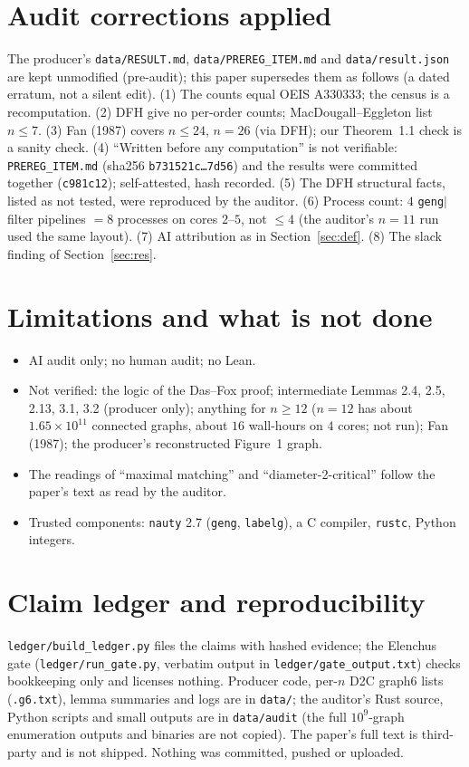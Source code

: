 \documentclass[10pt]{article}
\begin{document}
\section{Audit corrections applied}\label{sec:corr}
The producer's \texttt{data/RESULT.md}, \texttt{data/PREREG\_ITEM.md} and \texttt{data/result.json} are kept unmodified (pre-audit); this paper supersedes them as follows (a dated erratum, not a silent edit). (1) The counts equal OEIS A330333; the census is a recomputation. (2) DFH give no per-order counts; MacDougall--Eggleton list $n\le7$. (3) Fan (1987) covers $n\le24$, $n=26$ (via DFH); our Theorem~1.1 check is a sanity check. (4) ``Written before any computation'' is not verifiable: \texttt{PREREG\_ITEM.md} (sha256 \texttt{b731521c\dots 7d56}) and the results were committed together (\texttt{c981c12}); self-attested, hash recorded. (5) The DFH structural facts, listed as not tested, were reproduced by the auditor. (6) Process count: $4$ \texttt{geng}$|$filter pipelines $=8$ processes on cores $2$--$5$, not $\le4$ (the auditor's $n=11$ run used the same layout). (7) AI attribution as in Section~\ref{sec:def}. (8) The slack finding of Section~\ref{sec:res}.

\section{Limitations and what is not done}\label{sec:lim}
\begin{itemize}\itemsep=1pt
\item AI audit only; no human audit; no Lean.
\item Not verified: the logic of the Das--Fox proof; intermediate Lemmas 2.4, 2.5, 2.13, 3.1, 3.2 (producer only); anything for $n\ge12$ ($n=12$ has about $1.65\times10^{11}$ connected graphs, about $16$ wall-hours on $4$ cores; not run); Fan (1987); the producer's reconstructed Figure~1 graph.
\item The readings of ``maximal matching'' and ``diameter-2-critical'' follow the paper's text as read by the auditor.
\item Trusted components: \texttt{nauty} 2.7 (\texttt{geng}, \texttt{labelg}), a C compiler, \texttt{rustc}, Python integers.
\end{itemize}

\section{Claim ledger and reproducibility}\label{sec:ledger}
\texttt{ledger/build\_ledger.py} files the claims with hashed evidence; the Elenchus gate (\texttt{ledger/run\_gate.py}, verbatim output in \texttt{ledger/gate\_output.txt}) checks bookkeeping only and licenses nothing. Producer code, per-$n$ D2C graph6 lists (\texttt{.g6.txt}), lemma summaries and logs are in \texttt{data/}; the auditor's Rust source, Python scripts and small outputs are in \texttt{data/audit} (the full $10^9$-graph enumeration outputs and binaries are not copied). The paper's full text is third-party and is not shipped. Nothing was committed, pushed or uploaded.
\end{document}
